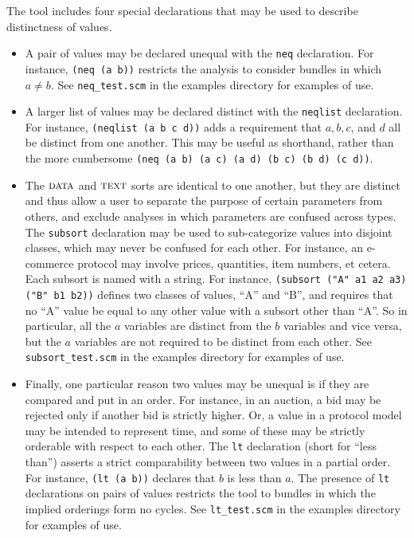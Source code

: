 The tool includes four special declarations that may be used to
describe distinctness of values.

\begin{itemize}

\item A pair of values may be declared unequal with the \texttt{neq}
  declaration.  For instance, \texttt{(neq (a b))} restricts the
  analysis to consider bundles in which $a \neq b$.  See
  \texttt{neq\_test.scm} in the examples directory for examples of use.

\item A larger list of values may be declared distinct with the
  \texttt{neqlist} declaration.  For instance, \texttt{(neqlist (a b c
    d))} adds a requirement that $a, b, c$, and $d$ all be distinct
  from one another.  This may be useful as shorthand, rather than the more
  cumbersome \texttt{(neq (a b) (a c) (a d) (b c) (b d) (c d))}.

\item The $\scap{data}$ and $\scap{text}$ sorts are identical to one
  another, but they are distinct and thus allow a user to separate the
  purpose of certain parameters from others, and exclude analyses in
  which parameters are confused across types.  The \texttt{subsort}
  declaration may be used to sub-categorize values into disjoint
  classes, which may never be confused for each other.  For instance,
  an e-commerce protocol may involve prices, quantities, item numbers,
  et cetera.  Each subsort is named with a string.  For instance,
  \texttt{(subsort ("A" a1 a2 a3) ("B" b1 b2))} defines two classes of
  values, ``A'' and ``B'', and requires that no ``A'' value be equal
  to any other value with a subsort other than ``A''.  So in
  particular, all the $a$ variables are distinct from the $b$
  variables and vice versa, but the $a$ variables are not required to
  be distinct from each other.  See \texttt{subsort\_test.scm} in the
  examples directory for examples of use.

\item Finally, one particular reason two values may be unequal is if
  they are compared and put in an order.  For instance, in an auction,
  a bid may be rejected only if another bid is strictly higher.  Or, a
  value in a protocol model may be intended to represent time, and
  some of these may be strictly orderable with respect to each other.
  The \texttt{lt} declaration (short for ``less than'') asserts a
  strict comparability between two values in a partial order.  For
  instance, \texttt{(lt (a b))} declares that $b$ is less than $a$.
  The presence of \texttt{lt} declarations on pairs of values
  restricts the tool to bundles in which the implied orderings form no
  cycles.  See \texttt{lt\_test.scm} in the examples directory for
  examples of use.
\end{itemize}

